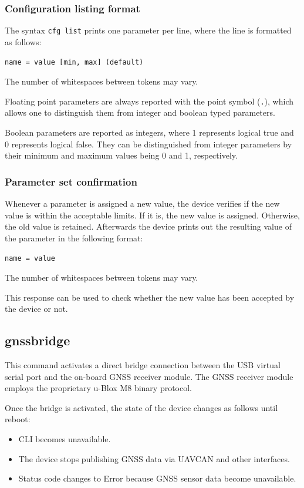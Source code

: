 \documentclass{zubaxdoc}
\begin{document}
\subsubsection{Configuration listing format}\label{sec:cli_cfg_listing}

The syntax \verb|cfg list| prints one parameter per line, where the line is formatted as follows:

\verb|name = value [min, max] (default)|

The number of whitespaces between tokens may vary.

Floating point parameters are always reported with the point symbol (\verb|.|),
which allows one to distinguish them from integer and boolean typed parameters.

Boolean parameters are reported as integers, where 1 represents logical true and 0 represents logical false.
They can be distinguished from integer parameters by their minimum and maximum values being 0 and 1,
respectively.

\subsubsection{Parameter set confirmation}\label{sec:cli_cfg_set_confirmation}

Whenever a parameter is assigned a new value, the device verifies if the new value is within the
acceptable limits.
If it is, the new value is assigned. Otherwise, the old value is retained.
Afterwards the device prints out the resulting value of the parameter in the following format:

\verb|name = value|

The number of whitespaces between tokens may vary.

This response can be used to check whether the new value has been accepted by the device or not.

\subsection{gnssbridge}

This command activates a direct bridge connection between the USB virtual serial port and the on-board
GNSS receiver module.
The GNSS receiver module employs the proprietary u-Blox M8 binary protocol.

Once the bridge is activated, the state of the device changes as follows until reboot:
\begin{itemize}
    \item CLI becomes unavailable.
    \item The device stops publishing GNSS data via UAVCAN and other interfaces.
    \item Status code changes to Error because GNSS sensor data become unavailable.
\end{itemize}
\end{document}
